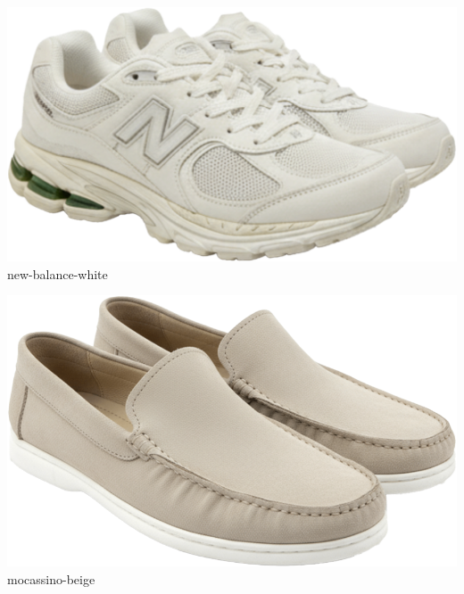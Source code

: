 \documentclass[10pt]{article}
\begin{document}
\begin{minipage}[t]{0.22\textwidth}\centering\vspace{0mm}
\includegraphics[width=\linewidth,keepaspectratio]{assets/shoes/new-balance-white.png}\\
\vspace{0.5mm}\tiny new-balance-white\end{minipage}
\begin{minipage}[t]{0.22\textwidth}\centering\vspace{0mm}
\includegraphics[width=\linewidth,keepaspectratio]{assets/shoes/mocassino-beige.png}\\
\vspace{0.5mm}\tiny mocassino-beige\end{minipage}
\
\vspace{2mm}\
\end{document}
